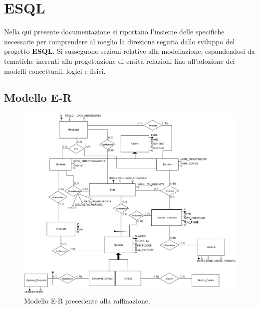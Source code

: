 \documentclass{article}
\begin{document}
\pagestyle{empty}

\section*{ESQL}
\large
Nella qui presente documentazione si riportano l'insieme delle specifiche necessarie per comprendere al meglio la direzione seguita dallo sviluppo del progetto \textbf{ESQL}. Si susseguono sezioni relative alla modellazione, espandendosi da tematiche inerenti alla progettazione di entità-relazioni fino all'adozione dei modelli concettuali, logici e fisici.

\subsection*{Modello E-R}
\begin{figure}[H]
    \includegraphics[width=1.1\textwidth]{foto1.png}
    \caption{Modello E-R precedente alla raffinazione.}
\end{figure}
\end{document}

